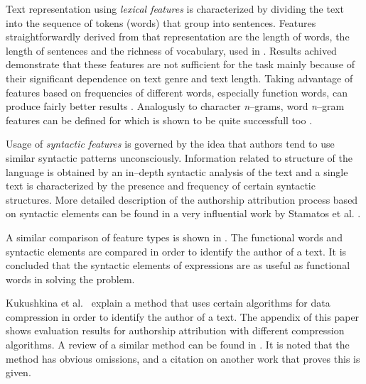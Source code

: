 \documentclass{llncs}
\begin{document}
Text representation using \emph{lexical features} is characterized by dividing
the text into the sequence of tokens (words) that group into sentences. Features
straightforwardly derived from that representation are the length of words, the
length of sentences and the richness of vocabulary, used in
\cite{mendenhall1887,holmes1994authorship} . Results achived demonstrate that
these features are not sufficient for the task mainly because of their
significant dependence on text genre and text length. Taking advantage of
features based on frequencies of different words, especially function words,
can produce fairly better results
\cite{argamon2005measuring,uzuner2005comparative,koppel2003exploiting,zhao2005effective}.
Analogusly to character \emph{n}--grams, word \emph{n}--gram features
can be defined for which is shown to be quite successfull too
\cite{keselj2003n,coyotl2006authorship}.

Usage of \emph{syntactic features} is governed by the idea that authors tend to
use similar syntactic patterns unconsciously. Information related to structure of
the language is obtained by an in--depth syntactic analysis of the text and a
single text is characterized by the presence and frequency of certain syntactic
structures. More detailed description of the authorship attribution process based
on syntactic elements can be found in a very influential work by Stamatos et al.
\cite{stamatatos2001computer}.

A similar comparison of feature types is shown in
\cite{uzuner2005comparative}. The functional words and syntactic
elements are compared in order to identify the author of a text. It is
concluded that the syntactic elements of expressions are as useful as functional 
words in solving the problem.

Kukushkina et al.\ \cite{kukushkina2001using} explain a method that uses certain
algorithms for data compression in order to identify the author of a text. The
appendix of this paper shows evaluation results for authorship attribution with
different compression algorithms.
A review of a similar method can be found in 
\cite{zhao2005effective}. It is noted that the method has obvious omissions, 
and a citation on another work that proves this is given.
\end{document}
